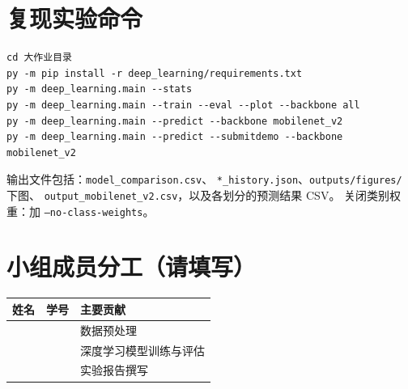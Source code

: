 \documentclass[12pt,a4paper]{ctexart}
\begin{document}
\appendix
\section{复现实验命令}

\begin{verbatim}
cd 大作业目录
py -m pip install -r deep_learning/requirements.txt
py -m deep_learning.main --stats
py -m deep_learning.main --train --eval --plot --backbone all
py -m deep_learning.main --predict --backbone mobilenet_v2
py -m deep_learning.main --predict --submitdemo --backbone mobilenet_v2
\end{verbatim}

输出文件包括：\texttt{model\_comparison.csv}、
\texttt{*\_history.json}、\texttt{outputs/figures/} 下图、
\texttt{output\_mobilenet\_v2.csv}，以及各划分的预测结果 CSV。
关闭类别权重：加 \texttt{--no-class-weights}。

\section{小组成员分工（请填写）}
\begin{table}[H]
  \centering
  \begin{tabular}{lll}
    \toprule
    姓名 & 学号 & 主要贡献 \\
    \midrule
    & & 数据预处理 \\
    & & 深度学习模型训练与评估 \\
    & & 实验报告撰写 \\
    \bottomrule
  \end{tabular}
\end{table}
\end{document}
